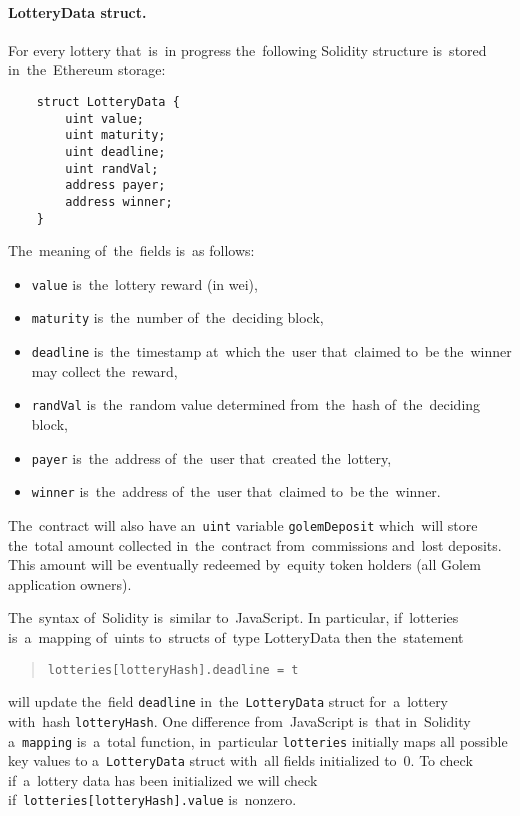\documentclass[a4paper]{article}
\begin{document}
    \paragraph{LotteryData struct.}
    For every lottery that~is~in progress the~following Solidity structure is~stored in~the~Ethereum storage:

    \begin{lstlisting}
    struct LotteryData {
        uint value;
        uint maturity;
        uint deadline;
        uint randVal;
        address payer;
        address winner;
    }
    \end{lstlisting}
%
    The~meaning of~the~fields is~as follows:
    \begin{itemize}
        \item \texttt{value} is~the~lottery reward (in wei),
        \item \texttt{maturity} is~the~number of~the~deciding block, %
        \item \texttt{deadline} is~the~timestamp at~which the~user that~claimed to~be the~winner may collect
            the~reward, %
        \item \texttt{randVal} is~the~random value determined from~the~hash of~the~deciding block, %
        \item \texttt{payer} is~the~address of~the~user that~created the~lottery,
        \item \texttt{winner} is~the~address of~the~user that~claimed to~be the~winner.
    \end{itemize}
    The~contract will also have an~\texttt{uint} variable \texttt{golemDeposit} which~will store
    the~total amount collected in~the~contract from~commissions and~lost deposits. This amount will be eventually
    redeemed by~equity token holders (all Golem application owners).

    The~syntax of~Solidity is~similar to~JavaScript. In particular, if~lotteries is~a~mapping of~uints to~structs of~type LotteryData then the~statement
    \begin{quote}
      \verb!lotteries[lotteryHash].deadline = t!
    \end{quote}
    will update the~field \texttt{deadline} in~the~\texttt{LotteryData} struct for~a~lottery with~hash
    \texttt{lotteryHash}. One difference from~JavaScript is~that in~Solidity a~\texttt{mapping} is~a~total
    function, in~particular \texttt{lotteries} initially maps all possible key values to
    a~\texttt{LotteryData} struct with~all fields initialized to~0. To check if~a~lottery data has been initialized
    we will check if~\texttt{lotteries[lotteryHash].value} is~nonzero.
\end{document}
